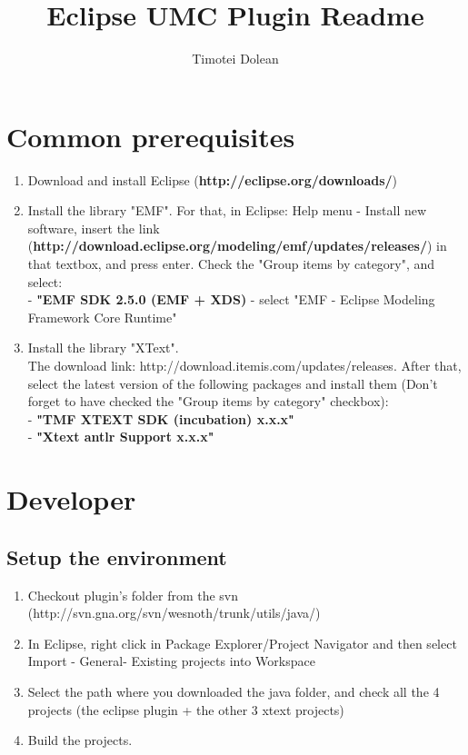 \documentclass[10pt]{article}
\title{Eclipse UMC Plugin Readme}
\author{Timotei Dolean}
\begin{document}
\maketitle

\newcommand{\icnt}{ \stepcounter{cnt} \thecnt }

\section{Common prerequisites}
\begin{enumerate}
\item Download and install Eclipse (\textbf{http://eclipse.org/downloads/})
\item Install the library "EMF". For that, in Eclipse: Help menu -  Install new software, insert the link \\
  (\textbf{http://download.eclipse.org/modeling/emf/updates/releases/}) in that textbox, and press enter.
  Check the "Group items by category", and select: \\
  \indent - \textbf{"EMF SDK 2.5.0 (EMF + XDS)} - select "EMF - Eclipse Modeling Framework Core Runtime"
\item Install the library "XText". \\
  The download link: http://download.itemis.com/updates/releases.
  After that, select the latest version of the following packages and
  install them (Don't forget to have checked the "Group items by category" checkbox): \\
  \indent - \textbf{"TMF XTEXT SDK (incubation) x.x.x"} \\
  \indent - \textbf{"Xtext antlr Support x.x.x"}
\end{enumerate}

\section{Developer}
\subsection{Setup the environment}
\begin{enumerate}
\item Checkout plugin's folder from the svn (http://svn.gna.org/svn/wesnoth/trunk/utils/java/)
\item In Eclipse, right click in Package Explorer/Project Navigator and then select
  Import - General- Existing projects into Workspace
\item Select the path where you downloaded the java folder, and check all the 4 projects
  (the eclipse plugin + the other 3 xtext projects)
\item Build the projects.
\end{enumerate}
\end{document}
